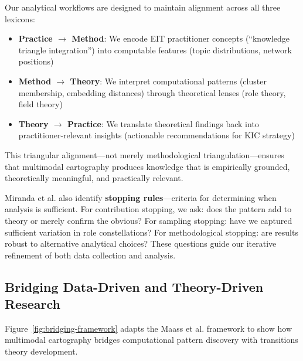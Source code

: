 \documentclass[../main.tex]{subfiles}
\begin{document}
\begin{insightbox}
Our analytical workflows are designed to maintain alignment across all three lexicons:
\begin{itemize}[nosep, leftmargin=*]
\item \textbf{Practice $\rightarrow$ Method}: We encode EIT practitioner concepts (``knowledge triangle integration'') into computable features (topic distributions, network positions)
\item \textbf{Method $\rightarrow$ Theory}: We interpret computational patterns (cluster membership, embedding distances) through theoretical lenses (role theory, field theory)
\item \textbf{Theory $\rightarrow$ Practice}: We translate theoretical findings back into practitioner-relevant insights (actionable recommendations for KIC strategy)
\end{itemize}
This triangular alignment---not merely methodological triangulation---ensures that multimodal cartography produces knowledge that is empirically grounded, theoretically meaningful, and practically relevant.
\end{insightbox}

Miranda et al. also identify \textbf{stopping rules}---criteria for determining when analysis is sufficient. For contribution stopping, we ask: does the pattern add to theory or merely confirm the obvious? For sampling stopping: have we captured sufficient variation in role constellations? For methodological stopping: are results robust to alternative analytical choices? These questions guide our iterative refinement of both data collection and analysis.

\subsection{Bridging Data-Driven and Theory-Driven Research}

Figure~\ref{fig:bridging-framework} adapts the Maass et al. \citeyear{maass2018data} framework to show how multimodal cartography bridges computational pattern discovery with transitions theory development.
\end{document}
